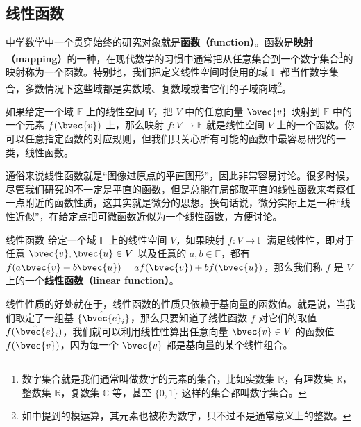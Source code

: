 


\subsection{线性函数}

中学数学中一个贯穿始终的研究对象就是\textbf{函数（function）}。函数是\textbf{映射（mapping）}的一种，在现代数学的习惯中通常把从任意集合到一个数字集合\footnote{数字集合就是我们通常叫做数字的元素的集合，比如实数集 $\mathbb{R}$，有理数集 $\mathbb{R}$，整数集 $\mathbb{R}$，复数集 $\mathbb{C}$ 等，甚至 $\{0, 1\}$ 这样的集合都叫数字集合。}的映射称为一个函数。特别地，我们把定义线性空间时使用的域 $\mathbb{F}$ 都当作数字集合，多数情况下这些域都是实数域、复数域或者它们的子域商域\footnote{如中提到的模运算，其元素也被称为数字，只不过不是通常意义上的整数。}。

如果给定一个域 $\mathbb{F}$ 上的线性空间 $V$，把 $V$ 中的任意向量 $\bvec{v}$ 映射到 $\mathbb{F}$ 中的一个元素 $f(\bvec{v})$ 上，那么映射 $f:V\rightarrow\mathbb{F}$ 就是线性空间 $V$ 上的一个函数。你可以任意指定函数的对应规则，但我们只关心所有可能的函数中最容易研究的一类，线性函数。

通俗来说线性函数就是“图像过原点的平直图形”，因此非常容易讨论。很多时候，尽管我们研究的不一定是平直的函数，但是总能在局部取平直的线性函数来考察任一点附近的函数性质，这其实就是微分的思想。换句话说，微分实际上是一种“线性近似”，在给定点把可微函数近似为一个线性函数，方便讨论。

\begin{definition}{线性函数}\label{def_DualSp_3}
给定一个域 $\mathbb{F}$ 上的线性空间 $V$，如果映射 $f:V\rightarrow\mathbb{F}$ 满足线性性，即对于任意 $\bvec{v}, \bvec{u}\in V$ 以及任意的 $a, b\in\mathbb{F}$，都有 $f(a\bvec{v}+b\bvec{u})=af(\bvec{v})+bf(\bvec{u})$，那么我们称 $f$ 是 $V$ 上的一个\textbf{线性函数（linear function）}。
\end{definition}

线性性质的好处就在于，线性函数的性质只依赖于基向量的函数值。就是说，当我们取定了一组基 $\{\hat{\bvec{e}}_i\}$，那么只要知道了线性函数 $f$ 对它们的取值 $f(\hat{\bvec{e}}_i)$，我们就可以利用线性性算出任意向量 $\bvec{v}\in V$ 的函数值 $f(\bvec{v})$，因为每一个 $\bvec{v}$ 都是基向量的某个线性组合。

